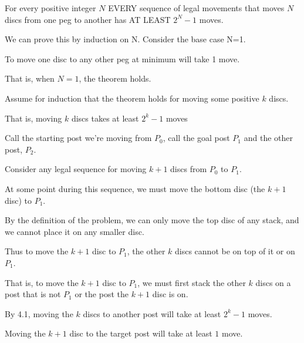 \documentclass[11pt]{article}
\begin{document}
\begin{problems}


  \newpage

  \problem

  \begin{theorem}
      For every positive integer $N$ EVERY sequence of legal movements that moves $N$ discs from one peg to another has AT LEAST $2^N - 1$ moves.
  \end{theorem}

  \smallskip

  \begin{longFormProof}

    \step We can prove this by induction on N.  Consider the base case N=1.

    \step To move one disc to any other peg at minimum will take 1 move.
      
    \step That is, when $N = 1$, the theorem holds.

    \begin{block}[A]
      {Assume for induction that the theorem holds for moving some positive $k$ discs.}

      \step That is, moving $k$ discs takes at least $2^k - 1$ moves

      \step Call the starting post we're moving from $P_0$, call the goal post $P_1$ and the other post, $P_2$.

      \begin{block}[B]
        {Consider any legal sequence for moving $k+1$ discs from $P_0$ to $P_1$.}

        \step At some point during this sequence, we must move the bottom disc (the $k+1$ disc) to $P_1$.

        \step By the definition of the problem, we can only move the top disc of any stack, and we cannot place it on any smaller disc.

        \step Thus to move the $k+1$ disc to $P_1$, the other $k$ discs cannot be on top of it or on $P_1$.

        \step That is, to move the $k+1$ disc to $P_1$, we must first stack the other $k$ discs on a post that is not $P_1$ or the post the $k+1$ disc is on.

        \step By 4.1, moving the $k$ discs to another post will take at least $2^k-1$ moves.

        \step Moving the $k+1$ disc to the target post will take at least $1$ move.


\end{block}
\end{block}
\end{longFormProof}
\end{problems}
\end{document}
